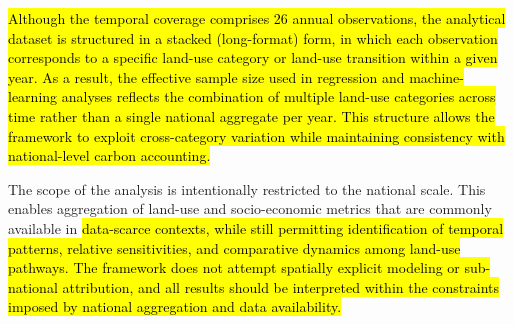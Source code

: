 \documentclass[10pt,letterpaper]{article}
\begin{document}
\hl{Although the temporal coverage comprises 26 annual observations, the analytical dataset is structured in a stacked (long-format) form, in which each observation corresponds to a specific land-use category or land-use transition within a given year. As a result, the effective sample size used in regression and machine-learning analyses reflects the combination of multiple land-use categories across time rather than a single national aggregate per year. This structure allows the framework to exploit cross-category variation while maintaining consistency with national-level carbon accounting.}

The scope of the analysis is intentionally restricted to the national scale. This enables aggregation of land-use and socio-economic metrics that are commonly available in \hl{data-scarce contexts, while still permitting identification of temporal patterns, relative sensitivities, and comparative dynamics among land-use pathways. The framework does not attempt spatially explicit modeling or sub-national attribution, and all results should be interpreted within the constraints imposed by national aggregation and data availability.}
\end{document}

